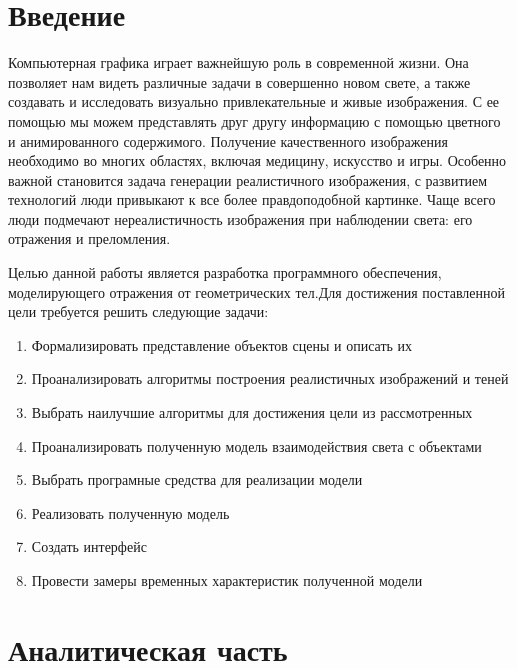 \documentclass[a4paper,14pt, unknownkeysallowed]{extreport}
\begin{document}
\setcounter{page}{4}
\renewcommand{\contentsname}{Содержание} 
\tableofcontents


\setcounter{page}{5}
\chapter{Введение}

Компьютерная графика играет важнейшую роль в современной жизни. 
Она позволяет нам видеть различные задачи в совершенно новом свете, а также создавать и исследовать визуально привлекательные и живые изображения.
С ее помощью мы можем представлять друг другу информацию с помощью цветного и анимированного содержимого. 
Получение качественного изображения необходимо во многих областях, включая медицину, искусство и игры.
Особенно важной становится задача генерации реалистичного изображения, с развитием технологий люди привыкают к все более
правдоподобной картинке. Чаще всего люди подмечают нереалистичность изображения при наблюдении света: его отражения и преломления.


Целью данной работы является разработка программного обеспечения, моделирующего отражения от геометрических тел.Для достижения поставленной цели требуется
решить следующие задачи:
\begin{enumerate}
	\item Формализировать представление объектов сцены и описать их
	\item Проанализировать алгоритмы построения реалистичных изображений и теней
	\item Выбрать наилучшие алгоритмы для достижения цели  из рассмотренных
	\item Проанализировать полученную  модель взаимодействия света с объектами
	\item Выбрать програмные средства для реализации модели
	\item Реализовать полученную модель
	\item Создать интерфейс
	\item Провести замеры временных характеристик полученной модели
\end{enumerate}





\chapter{Аналитическая часть}
\end{document}
